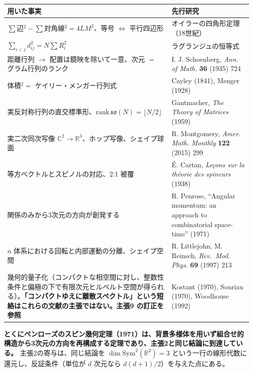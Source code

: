 \documentclass[
  10pt,
]{ltjsarticle}
\newcounter{none} %
\begin{document}
{\def\LTcaptype{none} %
\begin{longtable}[]{@{}
  >{\raggedright\arraybackslash}p{}
  >{\raggedright\arraybackslash}p{}@{}}
\toprule\noalign{}
\begin{minipage}[b]{\linewidth}\raggedright
用いた事実
\end{minipage} & \begin{minipage}[b]{\linewidth}\raggedright
先行研究
\end{minipage} \\
\midrule\noalign{}
\endhead
\bottomrule\noalign{}
\endlastfoot
\(\sum\)辺\(^2 - \sum\)対角線\(^2 = 4LM^2\)、等号 \(\iff\) 平行四辺形 &
オイラーの四角形定理（18世紀） \\
\(\sum_{i<j}d_{ij}^2 = N\sum R_i^2\) & ラグランジュの恒等式 \\
距離行列 \(\to\) 配置は鏡映を除いて一意、次元 \(=\) グラム行列のランク &
I. J. Schoenberg, \emph{Ann. of Math.} \textbf{36} (1935) 724 \\
体積\(^2 =\) ケイリー・メンガー行列式 & Cayley (1841), Menger (1928) \\
実反対称行列の直交標準形、\(\mathrm{rank}\,\mathfrak{so}(N) = \lfloor N/2\rfloor\)
& Gantmacher, \emph{The Theory of Matrices} (1959) \\
実二次同次写像
\(\mathbb{C}^2 \to \mathbb{R}^3\)、ホップ写像、シェイプ球面 & R.
Montgomery, \emph{Amer. Math. Monthly} \textbf{122} (2015) 299 \\
等方ベクトルとスピノルの対応、2:1 被覆 & É. Cartan, \emph{Leçons sur la
théorie des spineurs} (1938) \\
関係のみから3次元の方向が創発する & R. Penrose, ``Angular momentum: an
approach to combinatorial space-time'' (1971) \\
\(n\) 体系における回転と内部運動の分離、シェイプ空間 & R. Littlejohn, M.
Reinsch, \emph{Rev.~Mod. Phys.} \textbf{69} (1997) 213 \\
幾何的量子化（コンパクトな相空間に対し、整数性条件と偏極の下で有限次元ヒルベルト空間が得られる）。\textbf{「コンパクトゆえに離散スペクトル」という短絡はこれらの文献の主張ではない。主張9
の訂正を参照} & Kostant (1970), Souriau (1970), Woodhouse (1992) \\
\end{longtable}
}

\textbf{とくにペンローズのスピン幾何定理（1971）は、背景多様体を用いず組合せ的構造から3次元の方向を再構成する定理であり、主張2と同じ結論に到達している。}
主張2の寄与は、同じ結論を \(\dim\mathrm{Sym}^2(\mathbb{R}^2) = 3\)
という一行の線形代数に還元し、反証条件（単位が \(d\) 次元なら
\(d(d+1)/2\)）を与えた点にある。
\end{document}
